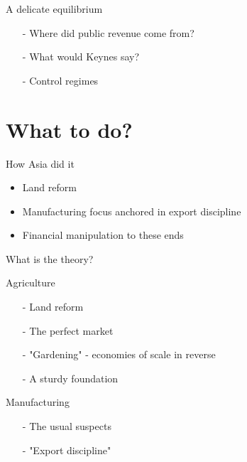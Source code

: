 \documentclass{beamer}
\begin{document}
\begin{frame}{A delicate equilibrium}

	\begin{itemize}
		\item[-] Where did public revenue come from? \pause 
		\item[-] What would Keynes say? \pause
		\item[-] Control regimes
	\end{itemize}

\end{frame}

\section{What to do?}

\begin{frame}{How Asia did it} %
\begin{itemize}
    \item Land reform \pause
    \item Manufacturing focus anchored in export discipline \pause
    \item Financial manipulation to these ends
\end{itemize}{}
\end{frame}

\begin{frame}{}
	What is the theory?
\end{frame}

\begin{frame}{Agriculture}

	\begin{itemize}
		\item[-] Land reform \pause
		\item[-] The perfect market \pause
		\item[-] "Gardening" - economies of scale in reverse \pause
		\item[-] A sturdy foundation 
	\end{itemize}

\end{frame}

\begin{frame}{Manufacturing}

	\begin{itemize}
		\item[-] The usual suspects \pause
		\item[-] "Export discipline"
	\end{itemize}

\end{frame}
\end{document}
